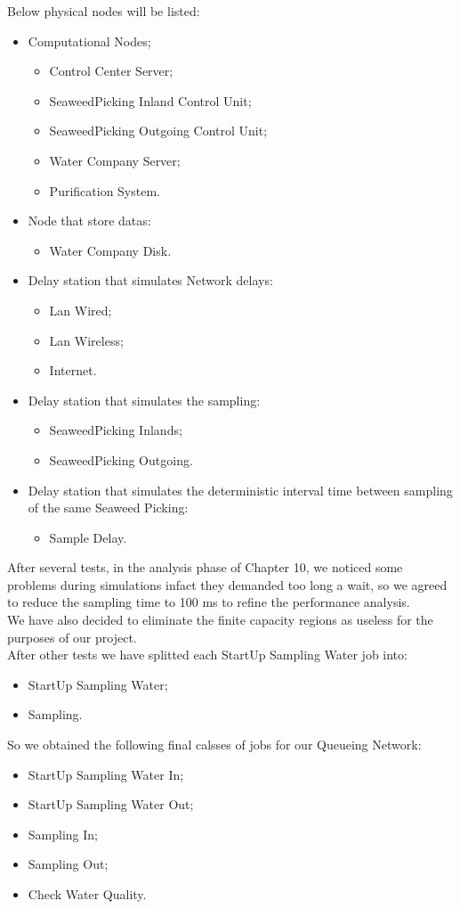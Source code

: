 Below physical nodes will be listed:
\begin{itemize}
\item Computational Nodes;
\begin{itemize}
	\item Control Center Server;
	\item SeaweedPicking Inland Control Unit;
	\item SeaweedPicking Outgoing Control Unit;
	\item Water Company Server;
	\item Purification System.
\end{itemize}
\item Node that store datas:
\begin{itemize}
	\item Water Company Disk.
\end{itemize}	
\item Delay station that simulates Network delays:
\begin{itemize}
	\item Lan Wired;
	\item Lan Wireless;
	\item Internet.
\end{itemize}	
\item Delay station that simulates the sampling:
\begin{itemize}
	\item SeaweedPicking Inlands;
	\item SeaweedPicking Outgoing.
\end{itemize}
\item Delay station that simulates the deterministic interval time 		between sampling of the same Seaweed Picking:
\begin{itemize}
	\item Sample Delay.
\end{itemize}
\end{itemize}

\bigskip
After several tests, in the analysis phase of Chapter 10, we noticed some problems during simulations infact they demanded too long a wait, so we agreed to reduce the sampling time to 100 ms to refine the performance analysis.\\
We have also decided to eliminate the finite capacity regions as useless for the purposes of our project. \\
After other tests we have splitted each StartUp Sampling Water job into:
\begin{itemize}
	\item StartUp Sampling Water;
	\item Sampling.
\end{itemize}
So we obtained the following final calsses of jobs for our Queueing Network: 
\begin{itemize}
	\item StartUp Sampling Water In;
	\item StartUp Sampling Water Out;
	\item Sampling In;
	\item Sampling Out;
	\item Check Water Quality.
\end{itemize}

